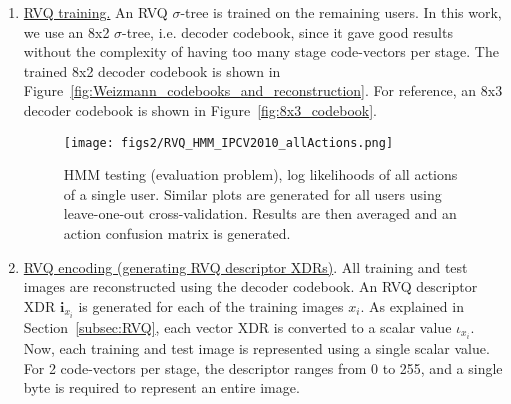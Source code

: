 \begin{Body}
\begin{enumerate}
\item \underline{RVQ training.}  An RVQ $\sigma$-tree is trained on the remaining users.  In this work, we use an 8x2 $\sigma$-tree, i.e. decoder codebook, since it gave good results without the complexity of having too many stage code-vectors per stage.  The trained 8x2 decoder codebook is shown in Figure~\ref{fig:Weizmann_codebooks_and_reconstruction}.  For reference, an 8x3 decoder codebook is shown in Figure~\ref{fig:8x3_codebook}.  

								\begin{figure}[t]	
								\texttt{[image: figs2/RVQ\_HMM\_IPCV2010\_allActions.png]}
								\caption{HMM testing (evaluation problem), log likelihoods of all actions of a single user.  Similar plots are generated for all users using leave-one-out cross-validation.  Results are then averaged and an action confusion matrix is generated.}
								\label{fig:RVQ_HMM_IPCV2010_allActions}
								\end{figure}

 
\item \underline{RVQ encoding (generating RVQ descriptor XDRs)}.  All training and test images are reconstructed using the decoder codebook.  An RVQ descriptor XDR $\mathbf{i}_{x_i}$ is generated for each of the training images $x_i$.  As explained in Section~\ref{subsec:RVQ}, each vector XDR is converted to a scalar value $\iota_{x_i}$.  Now, each training and test image is represented using a single scalar value.  For 2 code-vectors per stage, the descriptor ranges from 0 to 255, and a single byte is required to represent an entire image.  



\end{enumerate}
\end{Body}
